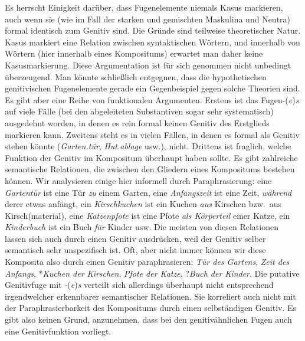 Es herrscht Einigkeit darüber, dass Fugenelemente niemals Kasus markieren, auch wenn sie (wie im Fall der starken und gemischten Maskulina und Neutra) formal identisch zum Genitiv sind.
Die Gründe sind teilweise theoretischer Natur.
Kasus markiert eine Relation zwischen syntaktischen Wörtern, und innerhalb von Wörtern (hier innerhalb eines Kompositums) erwartet man daher keine Kasusmarkierung.
Diese Argumentation ist für sich genommen nicht unbedingt überzeugend.
Man könnte schließlich entgegnen, dass die hypothetischen genitivischen Fugenelemente gerade ein Gegenbeispiel gegen solche Theorien sind.
Es gibt aber eine Reihe von funktionalen Argumenten.
Erstens ist das Fugen-\textit{}(\textit{e})\textit{s} auf viele Fälle (bei den abgeleiteten Substantiven sogar sehr systematisch) ausgedehnt worden, in denen es rein formal keinen Genitiv des Erstglieds markieren kann.
Zweitens steht es in vielen Fällen, in denen es formal als Genitiv stehen könnte (\textit{Garten.tür}, \textit{Hut.ablage} usw.), nicht.
Drittens ist fraglich, welche Funktion der Genitiv im Kompositum überhaupt haben sollte.
Es gibt zahlreiche semantische Relationen, die zwischen den Gliedern eines Kompositums bestehen können.
Wir analysieren einige hier informell durch Paraphrasierung:
eine \textit{Gartentür} ist eine Tür \textit{zu} einem Garten, eine \textit{Anfangszeit} ist eine Zeit, \textit{während} derer etwas anfängt, ein \textit{Kirschkuchen} ist ein Kuchen \textit{aus} Kirschen bzw.\ aus Kirsch(material), eine \textit{Katzenpfote} ist eine Pfote \textit{als Körperteil} einer Katze, ein \textit{Kinderbuch} ist ein Buch \textit{für} Kinder usw.
Die meisten von diesen Relationen lassen sich auch durch einen Genitiv ausdrücken, weil der Genitiv selber semantisch sehr unspezifisch ist.
Oft, aber nicht immer können wir diese Komposita also durch einen Genitiv paraphrasieren:
\textit{Tür des Gartens}, \textit{Zeit des Anfangs}, *\textit{Kuchen der Kirschen}, \textit{Pfote der Katze}, ?\textit{Buch der Kinder}.
Die putative Genitivfuge mit \textit{-}(\textit{e})\textit{s} verteilt sich allerdings überhaupt nicht entsprechend irgendwelcher erkennbarer semantischer Relationen.
Sie korreliert auch nicht mit der Paraphrasierbarkeit des Kompositums durch einen selbständigen Genitiv.
Es gibt also keinen Grund, anzunehmen, dass bei den genitivähnlichen Fugen auch eine Genitivfunktion vorliegt.

